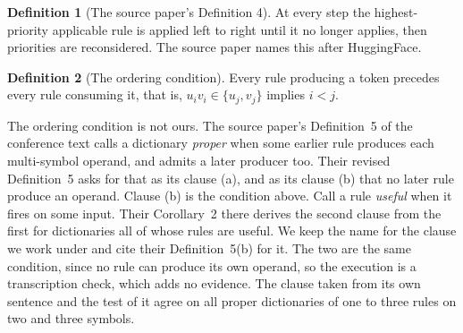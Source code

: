 \documentclass[11pt,a4paper]{article}
\theoremstyle{definition}
\newtheorem{definition}{Definition}
\theoremstyle{plain}
\begin{document}
\begin{definition}[The source paper's Definition 4]\label{def:hf}
At every step the highest-priority applicable rule is applied left to right until it no longer applies, then priorities
are reconsidered. The source paper names this after HuggingFace.
\end{definition}


\begin{definition}[The ordering condition]\label{def:ordered}
Every rule producing a token precedes every rule consuming it, that is, \(u_i v_i \in \{u_j, v_j\}\) implies \(i < j\).
\end{definition}

The ordering condition is not ours. The source paper's Definition~5 of the conference text calls a dictionary
\emph{proper} when some earlier rule produces each multi-symbol operand, and admits a later producer too. Their revised
Definition~5 \citep{berglund2024formalizing} asks for that as its clause (a), and as its clause (b) that no later rule
produce an operand. Clause (b) is the condition above. Call a rule \emph{useful} when it fires on some input. Their
Corollary~2 there derives the second clause from the first for dictionaries all of whose rules are useful. We keep the
name for the clause we work under and cite their Definition~5(b) for it. The two are the same condition, since no rule
can produce its own operand, so the execution is a transcription check, which adds no evidence. The clause taken from
its own sentence and the test of it agree on all \ClauseBDicts{} proper dictionaries of one to three rules on two and
three symbols.
\end{document}
